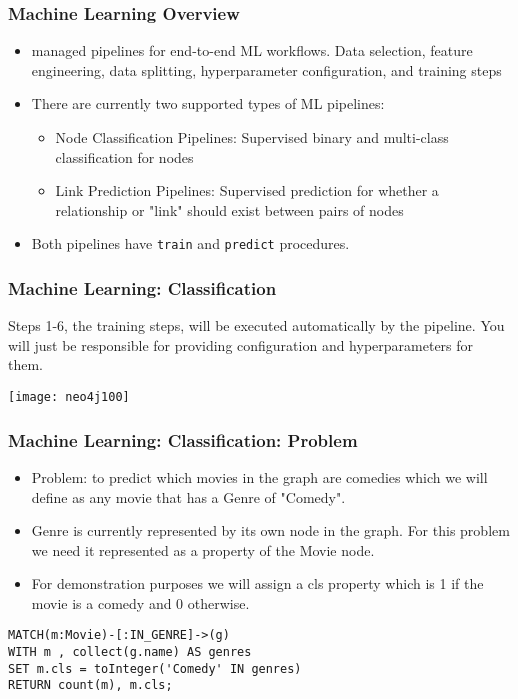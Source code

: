 \begin{frame}[fragile]\frametitle{Machine Learning Overview}

 
\begin{itemize}
\item managed pipelines for end-to-end ML workflows. Data selection, feature engineering, data splitting, hyperparameter configuration, and training steps 
\item There are currently two supported types of ML pipelines:
	\begin{itemize}
	\item Node Classification Pipelines: Supervised binary and multi-class classification for nodes
	\item Link Prediction Pipelines: Supervised prediction for whether a relationship or "link" should exist between pairs of nodes
	\end{itemize}
\item Both pipelines have \lstinline|train| and \lstinline|predict| procedures.
\end{itemize}

\end{frame}

\begin{frame}[fragile]\frametitle{Machine Learning: Classification}

Steps 1-6, the training steps, will be executed automatically by the pipeline. You will just be responsible for providing configuration and hyperparameters for them. 
 
\begin{center}
\texttt{[image: neo4j100]}
\end{center}	


\end{frame}

\begin{frame}[fragile]\frametitle{Machine Learning: Classification: Problem}

\begin{itemize}
\item Problem: to predict which movies in the graph are comedies which we will define as any movie that has a Genre of "Comedy".
\item Genre is currently represented by its own node in the graph. For this problem we need it represented as a property of the Movie node. 
\item For demonstration purposes we will assign a cls property which is 1 if the movie is a comedy and 0 otherwise.
\end{itemize}

\begin{lstlisting}
MATCH(m:Movie)-[:IN_GENRE]->(g)
WITH m , collect(g.name) AS genres
SET m.cls = toInteger('Comedy' IN genres)
RETURN count(m), m.cls;
\end{lstlisting}
\end{frame}

